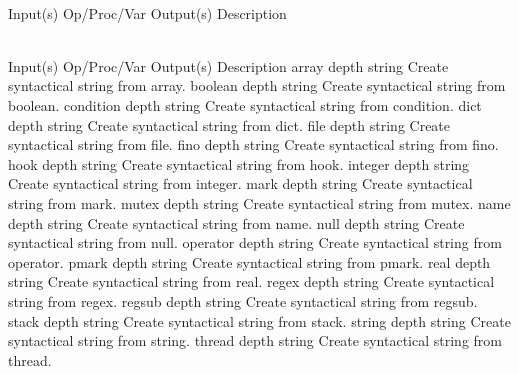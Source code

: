 \begin{longtable}{}
\caption{sprintsdict summary}
\\
\hline
\optableent
	{Input(s)}
	{Op/Proc/Var}
	{Output(s)}
	{Description}
\hline \hline
\endfirsthead
\caption[]{\emph{continued}} \\
\hline
\optableent
	{Input(s)}
	{Op/Proc/Var}
	{Output(s)}
	{Description}
\hline \hline \endhead
{} \endfoot
\hline \endlastfoot
\optableent
	{array depth}
	{{\bf {}}}
	{string}
	{Create syntactical string from array.}
\hline
\optableent
	{boolean depth}
	{{\bf {}}}
	{string}
	{Create syntactical string from boolean.}
\hline
\optableent
	{condition depth}
	{{\bf {}}}
	{string}
	{Create syntactical string from condition.}
\hline
\optableent
	{dict depth}
	{{\bf {}}}
	{string}
	{Create syntactical string from dict.}
\hline
\optableent
	{file depth}
	{{\bf {}}}
	{string}
	{Create syntactical string from file.}
\hline
\optableent
	{fino depth}
	{{\bf {}}}
	{string}
	{Create syntactical string from fino.}
\hline
\optableent
	{hook depth}
	{{\bf {}}}
	{string}
	{Create syntactical string from hook.}
\hline
\optableent
	{integer depth}
	{{\bf {}}}
	{string}
	{Create syntactical string from integer.}
\hline
\optableent
	{mark depth}
	{{\bf {}}}
	{string}
	{Create syntactical string from mark.}
\hline
\optableent
	{mutex depth}
	{{\bf {}}}
	{string}
	{Create syntactical string from mutex.}
\hline
\optableent
	{name depth}
	{{\bf {}}}
	{string}
	{Create syntactical string from name.}
\hline
\optableent
	{null depth}
	{{\bf {}}}
	{string}
	{Create syntactical string from null.}
\hline
\optableent
	{operator depth}
	{{\bf {}}}
	{string}
	{Create syntactical string from operator.}
\hline
\optableent
	{pmark depth}
	{{\bf {}}}
	{string}
	{Create syntactical string from pmark.}
\hline
\optableent
	{real depth}
	{{\bf {}}}
	{string}
	{Create syntactical string from real.}
\hline
\optableent
	{regex depth}
	{{\bf {}}}
	{string}
	{Create syntactical string from regex.}
\hline
\optableent
	{regsub depth}
	{{\bf {}}}
	{string}
	{Create syntactical string from regsub.}
\hline
\optableent
	{stack depth}
	{{\bf {}}}
	{string}
	{Create syntactical string from stack.}
\hline
\optableent
	{string depth}
	{{\bf {}}}
	{string}
	{Create syntactical string from string.}
\hline
\optableent
	{thread depth}
	{{\bf {}}}
	{string}
	{Create syntactical string from thread.}
\end{longtable}

